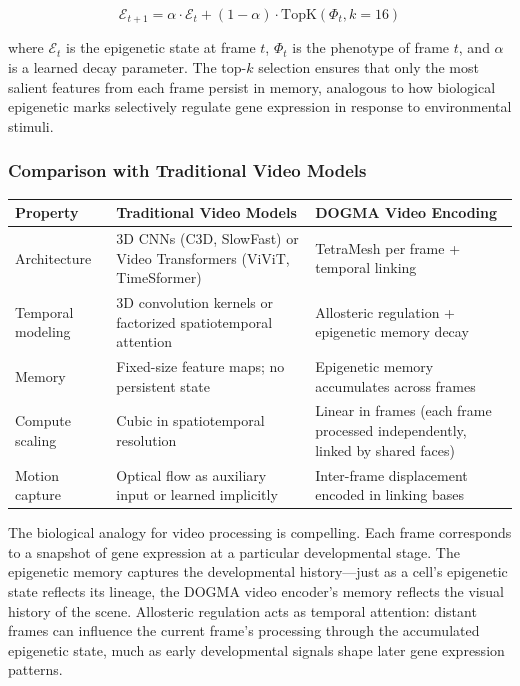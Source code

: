 \begin{equation}
\mathcal{E}_{t+1} = \alpha \cdot \mathcal{E}_t + (1 - \alpha) \cdot \text{TopK}(\Phi_t, k=16)
\label{eq:temporal-epigenetic}
\end{equation}

where $\mathcal{E}_t$ is the epigenetic state at frame $t$, $\Phi_t$ is the phenotype of frame $t$, and $\alpha$ is a learned decay parameter. The top-$k$ selection ensures that only the most salient features from each frame persist in memory, analogous to how biological epigenetic marks selectively regulate gene expression in response to environmental stimuli.

\subsubsection{Comparison with Traditional Video Models}

\begin{center}
\renewcommand{\arraystretch}{1.15}
\begin{tabularx}{0.95\textwidth}{l Y Y}
\toprule
\textbf{Property} & \textbf{Traditional Video Models} & \textbf{DOGMA Video Encoding} \\
\midrule
Architecture & 3D CNNs (C3D, SlowFast) or Video Transformers (ViViT, TimeSformer) & TetraMesh per frame + temporal linking \\
Temporal modeling & 3D convolution kernels or factorized spatiotemporal attention & Allosteric regulation + epigenetic memory decay \\
Memory & Fixed-size feature maps; no persistent state & Epigenetic memory accumulates across frames \\
Compute scaling & Cubic in spatiotemporal resolution & Linear in frames (each frame processed independently, linked by shared faces) \\
Motion capture & Optical flow as auxiliary input or learned implicitly & Inter-frame displacement encoded in linking bases \\
\bottomrule
\end{tabularx}
\end{center}

\begin{bioinsight}
The biological analogy for video processing is compelling. Each frame corresponds to a snapshot of gene expression at a particular developmental stage. The epigenetic memory captures the developmental history---just as a cell's epigenetic state reflects its lineage, the DOGMA video encoder's memory reflects the visual history of the scene. Allosteric regulation acts as temporal attention: distant frames can influence the current frame's processing through the accumulated epigenetic state, much as early developmental signals shape later gene expression patterns.
\end{bioinsight}

